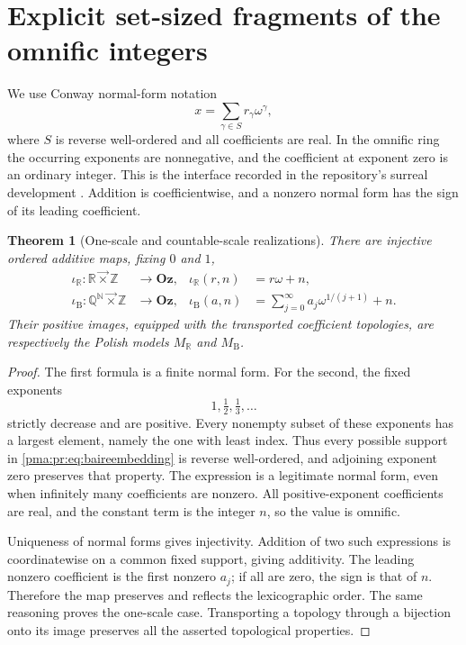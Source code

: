 \documentclass[11pt]{article}
\numberwithin{equation}{section}
\newtheorem{theorem}{Theorem}[section]
\theoremstyle{definition}
\theoremstyle{remark}
\newcommand{\N}{\mathbb N}
\newcommand{\Z}{\mathbb Z}
\newcommand{\Q}{\mathbb Q}
\newcommand{\R}{\mathbb R}
\newcommand{\Oz}{\mathbf{Oz}}
\newcommand{\lex}{\mathbin{\overrightarrow\times}}
\newcommand{\MR}{M_{\R}}
\newcommand{\MB}{M_{\mathrm B}}
\begin{document}
\section{Explicit set-sized fragments of the omnific integers}
\label{pma:pr:sec:omnific}

We use Conway normal-form notation
\[
 x=\sum_{\gamma\in S}r_\gamma\omega^\gamma,
\]
where $S$ is reverse well-ordered and all coefficients are real. In the
omnific ring the occurring exponents are nonnegative, and the coefficient
at exponent zero is an ordinary integer. This is the interface recorded
in the repository's surreal development \cite{RepoSurreal}. Addition is
coefficientwise, and a nonzero normal form has the sign of its leading
coefficient.

\begin{theorem}[One-scale and countable-scale realizations]
\label{pma:pr:thm:omnific}\label{pma:pr:prop:surreal}
There are injective ordered additive maps, fixing $0$ and $1$,
\begin{align}
 \iota_{\R}:\R\lex\Z&\longrightarrow\Oz,
 &\iota_{\R}(r,n)&=r\omega+n,
 \label{pma:pr:eq:realembedding}\\
 \iota_{\mathrm B}:\Q^{\N}\lex\Z&\longrightarrow\Oz,
 &\iota_{\mathrm B}(a,n)&=
       \sum_{j=0}^{\infty}a_j\omega^{1/(j+1)}+n.
 \label{pma:pr:eq:baireembedding}
\end{align}
Their positive images, equipped with the transported coefficient
topologies, are respectively the Polish models $\MR$ and $\MB$.
\end{theorem}
\begin{proof}
The first formula is a finite normal form. For the second, the fixed
exponents
\[
 1,\tfrac12,\tfrac13,\ldots
\]
strictly decrease and are positive. Every nonempty subset of these
exponents has a largest element, namely the one with least index.
Thus every possible support in \eqref{pma:pr:eq:baireembedding} is reverse
well-ordered, and adjoining exponent zero preserves that property.
The expression is a legitimate normal form, even when infinitely many
coefficients are nonzero. All positive-exponent coefficients are real,
and the constant term is the integer $n$, so the value is omnific.

Uniqueness of normal forms gives injectivity. Addition of two such
expressions is coordinatewise on a common fixed support, giving
additivity. The leading nonzero coefficient is the first nonzero $a_j$;
if all are zero, the sign is that of $n$. Therefore the map preserves
and reflects the lexicographic order. The same reasoning proves the
one-scale case. Transporting a topology through a bijection onto its
image preserves all the asserted topological properties.
\end{proof}
\end{document}
